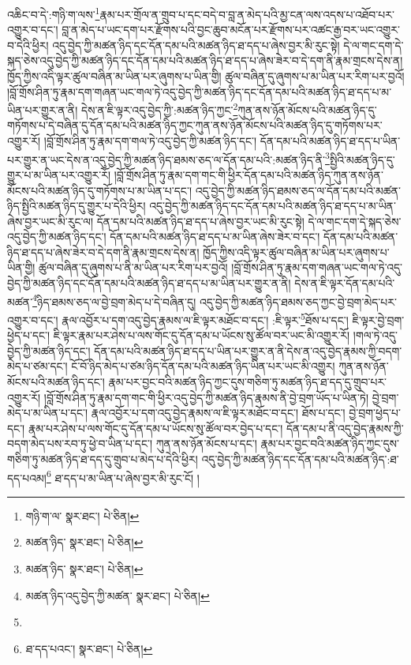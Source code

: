 འཆིང་བ་དེ་:གཉི་ག་ལས་\footnote{གཉི་ག་ལ་  སྣར་ཐང་།  པེ་ཅིན། }རྣམ་པར་གྲོལ་ན་གྲུབ་པ་དང་བདེ་བ་བླ་ན་མེད་པའི་མྱ་ངན་ལས་འདས་པ་འཐོབ་པར་འགྱུར་བ་དང་། བླ་ན་མེད་པ་ཡང་དག་པར་རྫོགས་པའི་བྱང་ཆུབ་མངོན་པར་རྫོགས་པར་འཚང་རྒྱ་བར་ཡང་འགྱུར་བ་དེའི་ཕྱིར། འདུ་བྱེད་ཀྱི་མཚན་ཉིད་དང་དོན་དམ་པའི་མཚན་ཉིད་ཐ་དད་པ་ཞེས་བྱར་མི་རུང་སྟེ། དེ་ལ་གང་དག་དེ་སྐད་ཅེས་འདུ་བྱེད་ཀྱི་མཚན་ཉིད་དང་དོན་དམ་པའི་མཚན་ཉིད་ཐ་དད་པ་ཞེས་ཟེར་བ་དེ་དག་ནི་རྣམ་གྲངས་དེས་ན། ཁྱོད་ཀྱིས་འདི་ལྟར་ཚུལ་བཞིན་མ་ཡིན་པར་ཞུགས་པ་ཡིན་གྱི། ཚུལ་བཞིན་དུ་ཞུགས་པ་མ་ཡིན་པར་རིག་པར་བྱའོ། །བློ་གྲོས་ཤིན་ཏུ་རྣམ་དག་གཞན་ཡང་གལ་ཏེ་འདུ་བྱེད་ཀྱི་མཚན་ཉིད་དང་དོན་དམ་པའི་མཚན་ཉིད་ཐ་དད་པ་མ་ཡིན་པར་གྱུར་ན་ནི། དེས་ན་ཇི་ལྟར་འདུ་བྱེད་ཀྱི་:མཚན་ཉིད་ཀྱང་\footnote{མཚན་ཉིད་  སྣར་ཐང་།  པེ་ཅིན། }ཀུན་ནས་ཉོན་མོངས་པའི་མཚན་ཉིད་དུ་གཏོགས་པ་དེ་བཞིན་དུ་དོན་དམ་པའི་མཚན་ཉིད་ཀྱང་ཀུན་ནས་ཉོན་མོངས་པའི་མཚན་ཉིད་དུ་གཏོགས་པར་འགྱུར་རོ། །བློ་གྲོས་ཤིན་ཏུ་རྣམ་དག་གལ་ཏེ་འདུ་བྱེད་ཀྱི་མཚན་ཉིད་དང་། དོན་དམ་པའི་མཚན་ཉིད་ཐ་དད་པ་ཡིན་པར་གྱུར་ན་ཡང་དེས་ན་འདུ་བྱེད་ཀྱི་མཚན་ཉིད་ཐམས་ཅད་ལ་དོན་དམ་པའི་:མཚན་ཉིད་ནི་\footnote{མཚན་ཉིད་  སྣར་ཐང་།  པེ་ཅིན། }སྤྱིའི་མཚན་ཉིད་དུ་གྱུར་པ་མ་ཡིན་པར་འགྱུར་རོ། །བློ་གྲོས་ཤིན་ཏུ་རྣམ་དག་གང་གི་ཕྱིར་དོན་དམ་པའི་མཚན་ཉིད་ཀུན་ནས་ཉོན་མོངས་པའི་མཚན་ཉིད་དུ་གཏོགས་པ་མ་ཡིན་པ་དང་། འདུ་བྱེད་ཀྱི་མཚན་ཉིད་ཐམས་ཅད་ལ་དོན་དམ་པའི་མཚན་ཉིད་སྤྱིའི་མཚན་ཉིད་དུ་གྱུར་པ་དེའི་ཕྱིར། འདུ་བྱེད་ཀྱི་མཚན་ཉིད་དང་དོན་དམ་པའི་མཚན་ཉིད་ཐ་དད་པ་མ་ཡིན་ཞེས་བྱར་ཡང་མི་རུང་ལ། དོན་དམ་པའི་མཚན་ཉིད་ཐ་དད་པ་ཞེས་བྱར་ཡང་མི་རུང་སྟེ། དེ་ལ་གང་དག་དེ་སྐད་ཅེས་འདུ་བྱེད་ཀྱི་མཚན་ཉིད་དང་། དོན་དམ་པའི་མཚན་ཉིད་ཐ་དད་པ་མ་ཡིན་ཞེས་ཟེར་བ་དང་། དོན་དམ་པའི་མཚན་ཉིད་ཐ་དད་པ་ཞེས་ཟེར་བ་དེ་དག་ནི་རྣམ་གྲངས་དེས་ན། ཁྱོད་ཀྱིས་འདི་ལྟར་ཚུལ་བཞིན་མ་ཡིན་པར་ཞུགས་པ་ཡིན་གྱི། ཚུལ་བཞིན་དུ་ཞུགས་པ་ནི་མ་ཡིན་པར་རིག་པར་བྱའོ། །བློ་གྲོས་ཤིན་ཏུ་རྣམ་དག་གཞན་ཡང་གལ་ཏེ་འདུ་བྱེད་ཀྱི་མཚན་ཉིད་དང་དོན་དམ་པའི་མཚན་ཉིད་ཐ་དད་པ་མ་ཡིན་པར་གྱུར་ན་ནི། དེས་ན་ཇི་ལྟར་དོན་དམ་པའི་མཚན་\footnote{མཚན་ཉིད་འདུ་བྱེད་ཀྱི་མཚན་  སྣར་ཐང་།  པེ་ཅིན། }ཉིད་ཐམས་ཅད་ལ་བྱེ་བྲག་མེད་པ་དེ་བཞིན་དུ། འདུ་བྱེད་ཀྱི་མཚན་ཉིད་ཐམས་ཅད་ཀྱང་བྱེ་བྲག་མེད་པར་འགྱུར་བ་དང་། རྣལ་འབྱོར་པ་དག་འདུ་བྱེད་རྣམས་ལ་ཇི་ལྟར་མཐོང་བ་དང་། :ཇི་ལྟར་\footnote{}ཐོས་པ་དང་། ཇི་ལྟར་བྱེ་བྲག་ཕྱེད་པ་དང་། ཇི་ལྟར་རྣམ་པར་ཤེས་པ་ལས་གོང་དུ་དོན་དམ་པ་ཡོངས་སུ་ཚོལ་བར་ཡང་མི་འགྱུར་རོ། །གལ་ཏེ་འདུ་བྱེད་ཀྱི་མཚན་ཉིད་དང་། དོན་དམ་པའི་མཚན་ཉིད་ཐ་དད་པ་ཡིན་པར་གྱུར་ན་ནི་དེས་ན་འདུ་བྱེད་རྣམས་ཀྱི་བདག་མེད་པ་ཙམ་དང་། ངོ་བོ་ཉིད་མེད་པ་ཙམ་ཉིད་དོན་དམ་པའི་མཚན་ཉིད་ཡིན་པར་ཡང་མི་འགྱུར། ཀུན་ནས་ཉོན་མོངས་པའི་མཚན་ཉིད་དང་། རྣམ་པར་བྱང་བའི་མཚན་ཉིད་ཀྱང་དུས་གཅིག་ཏུ་མཚན་ཉིད་ཐ་དད་དུ་གྲུབ་པར་འགྱུར་རོ། །བློ་གྲོས་ཤིན་ཏུ་རྣམ་དག་གང་གི་ཕྱིར་འདུ་བྱེད་ཀྱི་མཚན་ཉིད་རྣམས་ནི་བྱེ་བྲག་ཡོད་པ་ཡིན་ཏེ། བྱེ་བྲག་མེད་པ་མ་ཡིན་པ་དང་། རྣལ་འབྱོར་པ་དག་འདུ་བྱེད་རྣམས་ལ་ཇི་ལྟར་མཐོང་བ་དང་། ཐོས་པ་དང་། བྱེ་བྲག་ཕྱེད་པ་དང་། རྣམ་པར་ཤེས་པ་ལས་གོང་དུ་དོན་དམ་པ་ཡོངས་སུ་ཚོལ་བར་བྱེད་པ་དང་། དོན་དམ་པ་ནི་འདུ་བྱེད་རྣམས་ཀྱི་བདག་མེད་པས་རབ་ཏུ་ཕྱེ་བ་ཡིན་པ་དང་། ཀུན་ནས་ཉོན་མོངས་པ་དང་། རྣམ་པར་བྱང་བའི་མཚན་ཉིད་ཀྱང་དུས་གཅིག་ཏུ་མཚན་ཉིད་ཐ་དད་དུ་གྲུབ་པ་མེད་པ་དེའི་ཕྱིར། འདུ་བྱེད་ཀྱི་མཚན་ཉིད་དང་དོན་དམ་པའི་མཚན་ཉིད་:ཐ་དད་པའམ།\footnote{ཐ་དད་པའང་།  སྣར་ཐང་།  པེ་ཅིན། } ཐ་དད་པ་མ་ཡིན་པ་ཞེས་བྱར་མི་རུང་ངོ། །
